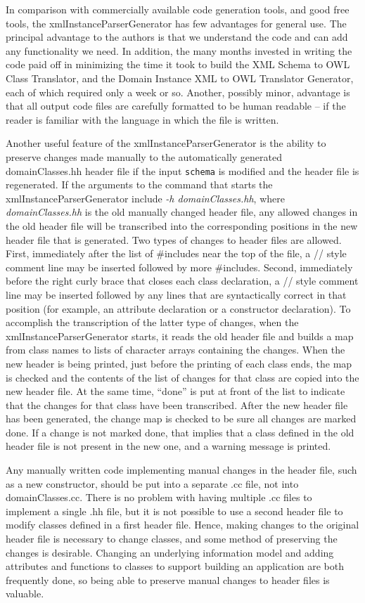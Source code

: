 \documentclass[preprint,12pt]{elsarticle}
\begin{document}
In comparison with commercially available code generation tools, and good
free tools, the xmlInstanceParserGenerator has few advantages for general
use. The principal advantage to the authors is that we understand the code
and can add any functionality we need. In addition, the many months
invested in writing the code paid off in minimizing the time it took to
build the XML Schema to OWL Class Translator, and the Domain Instance XML
to OWL Translator Generator, each of which required only a week or so.
Another, possibly minor, advantage is that all output code files are
carefully formatted to be human readable – if the reader is familiar with
the language in which the file is written.

Another useful feature of the xmlInstanceParserGenerator is the ability to
preserve changes made manually to the automatically generated
domainClasses.hh header file if the input {\tt schema} is modified and the
header file is regenerated. If the arguments to the command that starts the
xmlInstanceParserGenerator include {\em -h domainClasses.hh}, where {\em
  domainClasses.hh} is the old manually changed header file, any allowed
changes in the old header file will be transcribed into the corresponding
positions in the new header file that is generated. Two types of changes to
header files are allowed. First, immediately after the list of \#includes
near the top of the file, a // style comment line may be inserted followed
by more \#includes. Second, immediately before the right curly brace that
closes each class declaration, a // style comment line may be inserted
followed by any lines that are syntactically correct in that position (for
example, an attribute declaration or a constructor declaration). To
accomplish the transcription of the latter type of changes, when the
xmlInstanceParserGenerator starts, it reads the old header file and builds
a map from class names to lists of character arrays containing the changes.
When the new header is being printed, just before the printing of each
class ends, the map is checked and the contents of the list of changes for
that class are copied into the new header file. At the same time, ``done'' is
put at front of the list to indicate that the changes for that class have
been transcribed. After the new header file has been generated, the change
map is checked to be sure all changes are marked done. If a change is not
marked done, that implies that a class defined in the old header file is
not present in the new one, and a warning message is printed.

Any manually written code implementing manual changes in the header file,
such as a new constructor, should be put into a separate .cc file, not into
domainClasses.cc. There is no problem with having multiple .cc files to
implement a single .hh file, but it is not possible to use a second header
file to modify classes defined in a first header file. Hence, making
changes to the original header file is necessary to change classes, and
some method of preserving the changes is desirable. Changing an underlying
information model and adding attributes and functions to classes to support
building an application are both frequently done, so being able to preserve
manual changes to header files is valuable.
\end{document}
